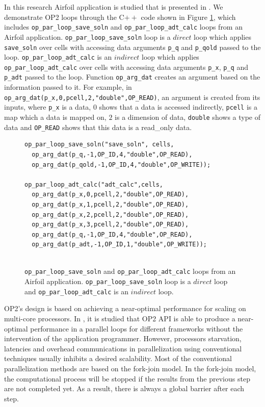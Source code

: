 \documentclass[conference]{IEEEtran}
\begin{document}
In this research Airfoil application is studied that is presented in \cite{o8}. We demonstrate OP2 loops through the C$++$ code shown in Figure \ref{o1}, which includes \texttt{op\_par\_loop\_save\_soln} and \texttt{op\_par\_loop\_adt\_calc} loops from an Airfoil application. \texttt{op\_par\_loop\_save\_soln} loop is a $direct$ loop which applies \texttt{save\_soln} over cells with accessing data arguments \texttt{p\_q} and \texttt{p\_qold} passed to the loop. \texttt{op\_par\_loop\_adt\_calc} is an $indirect$ loop which applies \texttt{op\_par\_loop\_adt\_calc} over cells with accessing data arguments \texttt{p\_x}, \texttt{p\_q} and \texttt{p\_adt} passed to the loop. Function \texttt{op\_arg\_dat} creates an argument based on the information passed to it. For example, in \texttt{op\_arg\_dat(p\_x,0,pcell,2,"double",OP\_READ)}, an argument is created from its inputs, where \texttt{p\_x} is a data, $0$ shows that a data is accessed indirectly, \texttt{pcell} is a map which a data is mapped on, $2$ is a dimension of data, \texttt{double} shows a type of data and \texttt{OP\_READ} shows that this data is a read\_only data.

\begin{figure} 
    \begin{lstlisting}
op_par_loop_save_soln("save_soln", cells,
  op_arg_dat(p_q,-1,OP_ID,4,"double",OP_READ),
  op_arg_dat(p_qold,-1,OP_ID,4,"double",OP_WRITE));
  
op_par_loop_adt_calc("adt_calc",cells,
  op_arg_dat(p_x,0,pcell,2,"double",OP_READ),
  op_arg_dat(p_x,1,pcell,2,"double",OP_READ),
  op_arg_dat(p_x,2,pcell,2,"double",OP_READ),
  op_arg_dat(p_x,3,pcell,2,"double",OP_READ),
  op_arg_dat(p_q,-1,OP_ID,4,"double",OP_READ),
  op_arg_dat(p_adt,-1,OP_ID,1,"double",OP_WRITE));
  
    \end{lstlisting}
    \caption{\small{\texttt{op\_par\_loop\_save\_soln} and \texttt{op\_par\_loop\_adt\_calc} loops from an Airfoil application.  \texttt{op\_par\_loop\_save\_soln} loop is a $direct$ loop and \texttt{op\_par\_loop\_adt\_calc} is an $indirect$ loop.}}
    \label{o1}
\end{figure}



OP2's design is based on achieving a near-optimal performance for scaling on multi-core processors. In \cite{o3,o4}, it is studied that OP2 API is able to produce a near-optimal performance in a parallel loops for different frameworks without the intervention of the application programmer. However, processors starvation, latencies and overhead communications in parallelization using conventional techniques usually inhibits a desired scalability. Most of the conventional parallelization methods are based on the fork-join model. In the fork-join model, the computational process will be stopped if the results from the previous step are not completed yet. As a result, there is always a global barrier after each step. 
\end{document}
